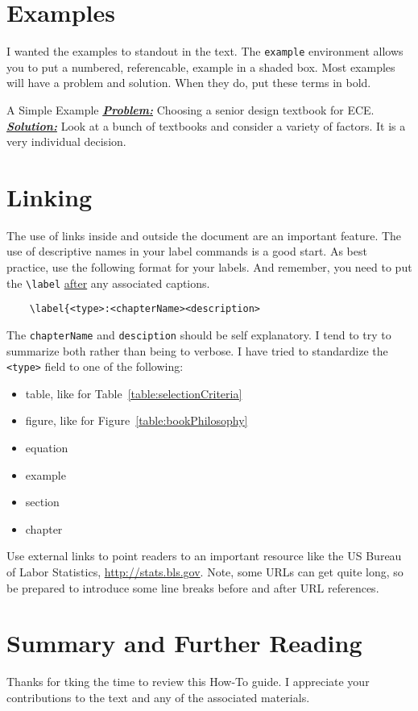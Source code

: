 \section{Examples}
\label{section:howToExamples}

I wanted the examples to standout in the text.  The \verb+example+ environment allows
you to put a numbered, referencable, example in a shaded box.  Most examples will have
a problem and solution.  When they do, put these terms in bold.

\begin{example}{A Simple Example}
\label{example:aSimpleExample}
\emph{\textbf{\ul{Problem:}}} Choosing a senior design textbook for ECE. \\	%
\noindent\emph{\textbf{\ul{Solution:}}} Look at a bunch of textbooks and 
consider a variety of factors.  It is a very individual decision.
\end{example}

\section{Linking}
\label{section:howToLinking}
The use of links inside and outside the document are an important feature.  The use
of descriptive names in your label commands is a good start.  As best practice, use
the following format for your labels.  And remember, you need to put the 
\verb+\label+ \ul{after} any associated captions.

\begin{verbatim}
	\label{<type>:<chapterName><description>
\end{verbatim}

The \verb+chapterName+ and \verb+desciption+ should be self explanatory.  I tend to 
try to summarize both rather than being to verbose.  I have tried to standardize the 
\verb+<type>+ field to one of the following:
\begin{itemize}
\item  table, like for Table~\ref{table:selectionCriteria}
\item  figure, like for Figure~\ref{table:bookPhilosophy}
\item equation
\item example
\item section
\item chapter
\end{itemize}

Use external links to point readers to an important resource like the US Bureau of Labor Statistics, 
\url{http://stats.bls.gov}. Note, some URLs can get quite long, so be prepared to introduce some line 
breaks before and after URL references.

\section{Summary and Further Reading}
\label{section:summary-and-further-reading}
Thanks for tking the time to review this How-To guide.  I appreciate your contributions to the text and any of the 
associated materials.
